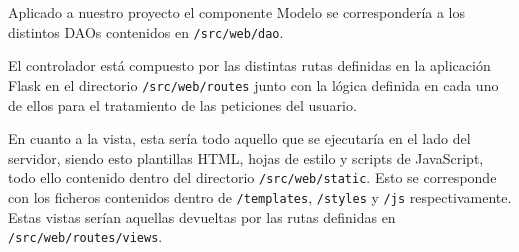 Aplicado a nuestro proyecto el componente Modelo se correspondería a los distintos DAOs contenidos en \texttt{/src/web/dao}.

El controlador está compuesto por las distintas rutas definidas en la aplicación Flask en el directorio \texttt{/src/web/routes} junto con la lógica definida en cada uno de ellos para el tratamiento de las peticiones del usuario.

En cuanto a la vista, esta sería todo aquello que se ejecutaría en el lado del servidor, siendo esto plantillas HTML, hojas de estilo y scripts de JavaScript, todo ello contenido dentro del directorio \texttt{/src/web/static}. Esto se corresponde con los ficheros contenidos dentro de \texttt{/templates}, \texttt{/styles} y \texttt{/js} respectivamente. Estas vistas serían aquellas devueltas por las rutas definidas en \texttt{/src/web/routes/views}.